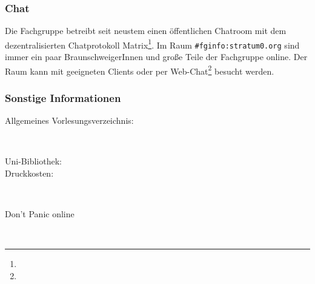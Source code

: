 	\subsubsection*{Chat}
		Die Fachgruppe betreibt seit neustem einen öffentlichen Chatroom mit dem dezentralisierten Chatprotokoll Matrix\footnote{}. Im Raum \texttt{\#fginfo:stratum0.org} sind immer ein paar BraunschweigerInnen und große Teile der Fachgruppe online. Der Raum kann mit geeigneten Clients oder per Web-Chat\footnote{} besucht werden.





\subsubsection*{Sonstige Informationen}
	\begin{description}
		\item[Allgemeines Vorlesungsverzeichnis:] ~\\
			{\footnotesize{}}
		\item[Uni-Bibliothek:] 
			{\footnotesize{}}
		\item[Druckkosten:] ~\\
			{\footnotesize{}}
		\item[Don't Panic online] ~\\
			{\footnotesize{}}
	\end{description}
